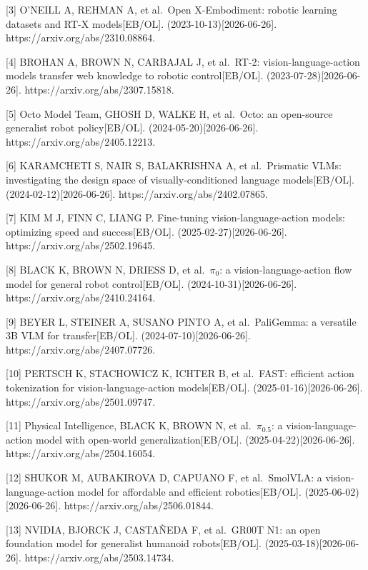 \documentclass[
  chinese,
]{ctexart}
\begin{document}
{[}3{]} O'NEILL A, REHMAN A, et al.~Open X-Embodiment: robotic learning
datasets and RT-X models{[}EB/OL{]}. (2023-10-13){[}2026-06-26{]}.
https://arxiv.org/abs/2310.08864.

{[}4{]} BROHAN A, BROWN N, CARBAJAL J, et al.~RT-2:
vision-language-action models transfer web knowledge to robotic
control{[}EB/OL{]}. (2023-07-28){[}2026-06-26{]}.
https://arxiv.org/abs/2307.15818.

{[}5{]} Octo Model Team, GHOSH D, WALKE H, et al.~Octo: an open-source
generalist robot policy{[}EB/OL{]}. (2024-05-20){[}2026-06-26{]}.
https://arxiv.org/abs/2405.12213.

{[}6{]} KARAMCHETI S, NAIR S, BALAKRISHNA A, et al.~Prismatic VLMs:
investigating the design space of visually-conditioned language
models{[}EB/OL{]}. (2024-02-12){[}2026-06-26{]}.
https://arxiv.org/abs/2402.07865.

{[}7{]} KIM M J, FINN C, LIANG P. Fine-tuning vision-language-action
models: optimizing speed and success{[}EB/OL{]}.
(2025-02-27){[}2026-06-26{]}. https://arxiv.org/abs/2502.19645.

{[}8{]} BLACK K, BROWN N, DRIESS D, et al.~\(\pi_0\): a
vision-language-action flow model for general robot control{[}EB/OL{]}.
(2024-10-31){[}2026-06-26{]}. https://arxiv.org/abs/2410.24164.

{[}9{]} BEYER L, STEINER A, SUSANO PINTO A, et al.~PaliGemma: a
versatile 3B VLM for transfer{[}EB/OL{]}. (2024-07-10){[}2026-06-26{]}.
https://arxiv.org/abs/2407.07726.

{[}10{]} PERTSCH K, STACHOWICZ K, ICHTER B, et al.~FAST: efficient
action tokenization for vision-language-action models{[}EB/OL{]}.
(2025-01-16){[}2026-06-26{]}. https://arxiv.org/abs/2501.09747.

{[}11{]} Physical Intelligence, BLACK K, BROWN N, et al.~\(\pi_{0.5}\):
a vision-language-action model with open-world
generalization{[}EB/OL{]}. (2025-04-22){[}2026-06-26{]}.
https://arxiv.org/abs/2504.16054.

{[}12{]} SHUKOR M, AUBAKIROVA D, CAPUANO F, et al.~SmolVLA: a
vision-language-action model for affordable and efficient
robotics{[}EB/OL{]}. (2025-06-02){[}2026-06-26{]}.
https://arxiv.org/abs/2506.01844.

{[}13{]} NVIDIA, BJORCK J, CASTAÑEDA F, et al.~GR00T N1: an open
foundation model for generalist humanoid robots{[}EB/OL{]}.
(2025-03-18){[}2026-06-26{]}. https://arxiv.org/abs/2503.14734.
\end{document}
